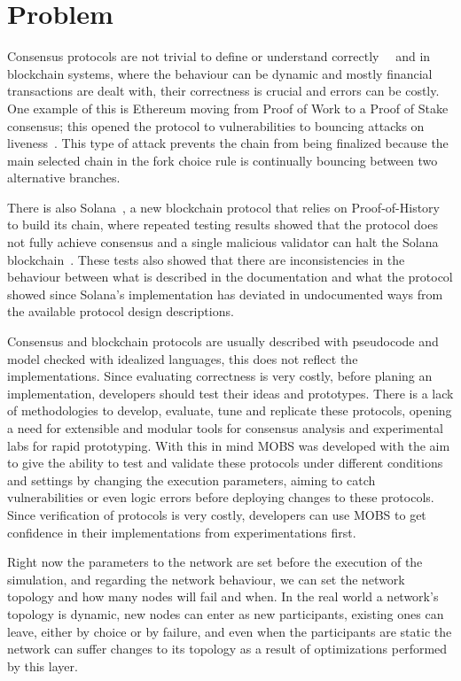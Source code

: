 \section{Problem}\label{sub:problem}
Consensus protocols are not trivial to define or understand correctly~\cite{paxos}~\cite{have_we_reached_consensus}
and in blockchain systems, where the behaviour can be dynamic and mostly 
financial transactions are dealt with, their correctness is crucial and errors can be costly. One example of this is Ethereum moving from 
Proof of Work to a Proof of Stake consensus; this opened the protocol to vulnerabilities to bouncing attacks on liveness~\cite{ethereum_analysis}.
This type of attack prevents the chain from being finalized because the main selected chain in the fork choice rule
is continually bouncing between two alternative branches.

There is also Solana~\cite{solana}, a new blockchain protocol that relies on Proof-of-History to build its chain,
where repeated testing results showed that the protocol does not fully achieve consensus and
a single malicious validator can halt the Solana blockchain~\cite{solana_halting_problem}. These tests also showed that there are
inconsistencies in the behaviour between what is described in the documentation and what the protocol showed since Solana's implementation
has deviated in undocumented ways from the available protocol design descriptions.

Consensus and blockchain protocols are usually described with pseudocode and model checked with idealized languages,
this does not reflect the implementations. Since evaluating correctness is very costly\cite{desidn_and_validation}, before planing an 
implementation, developers should test their ideas and prototypes. There is a lack of methodologies to develop,
evaluate, tune and replicate these protocols, opening a need for extensible and modular tools for consensus analysis and
experimental labs for rapid prototyping.
With this in mind MOBS was developed with the aim to give the ability to test and validate these protocols under different conditions and settings by 
changing the execution parameters, aiming to catch vulnerabilities or even logic errors before deploying changes to these protocols.
Since verification of protocols is very costly, developers can use MOBS to get confidence in their implementations
from experimentations first.

Right now the parameters to the network are set before the execution of the simulation, and regarding the network behaviour, we can
set the network topology and how many nodes will fail and when. In the real world a network's topology is dynamic, new nodes can enter
as new participants, existing ones can leave, either by choice or by failure, and even when the participants are static the network
can suffer changes to its topology as a result of optimizations performed by this layer.


